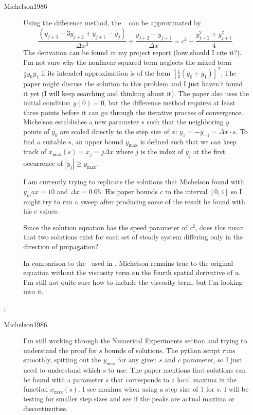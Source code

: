 \begin{description}
{\begin{description}
\item[Michelson1986]
Using the difference method, the \KSe\  can be approximated by
\begin{equation}
    \frac{(y_{j+3} - 3 y_{j+2} + y_{j+1} - y_j)}{\Delta x^3} + \frac{y_{j+2} - y_{j+1}}{\Delta x} = c^2 - \frac{y_{j+2}^2 + y_{j+1}^2}{4}.
\end{equation}
The derivation can be found in my project report (how should I cite it?). I'm
not sure why the nonlinear squared term neglects the mixed term $\frac{1}{2} y_0 y_1$ if
its intended approximation is of the form $[\frac{1}{2} (y_0 + y_1)]^2$. The paper might
discuss the solution to this problem and I just haven't found it yet (I will keep
searching and thinking about it). The paper also uses the initial condition $y(0) = 0$,
but the difference method requires at least three points before it can go through
the iterative process of convergence. Michelson establishes a new parameter $s$ such
that the neighboring $y$ points of $y_0$ are scaled directly to the step size of $x$:
$y_1 = -y_{-1} = \Delta x \cdot s$. To find a suitable $s$, an upper bound $y_{\text{max}}$
is defined such that we can keep track of $x_{\text{max}}(s) = x_j = j \Delta x$ where $j$
is the index of $y_j$ at the first occurrence of $|y_j| \geq y_{\text{max}}$.

I am currently trying to replicate the solutions that Michelson found with $y_max = 10$ and
$\Delta x = 0.05$. His paper bounds $c$ to the interval $[0,4]$ so I might try to run a sweep
after producing some of the result he found with his $c$ values.

Since the solution equation has the speed parameter of $c^2$, does this mean
that two solutions exist for each set of steady system differing only in the
direction of propagation?

In comparison to the \KSe\ used in ,
Michelson remains true to the original equation without the viscosity term on the fourth
spatial derivative of $u$. I'm still not quite sure how to include the viscosity term, but I'm
looking into it.

\end{description}
}

{ :
\begin{description}
\item[Michelson1986]
I'm still working through the Numerical Experiments section and trying to
understand the proof for $s$ bounds of solutions. The python script runs
smoothly, spitting out the $y_{\text{max}}$ for any given $s$ and $c$ parameter,
so I just need to understand which $s$ to use. The paper mentions that solutions
can be found with a parameter $s$ that corresponds to a local maxima in the
function $x_{\text{max}}(s)$. I see maxima when using a step size of 1 for $s$.
I will be testing for smaller step sizes and see if the peaks are actual
maxima or discontinuities.


\end{description}}
\end{description}

